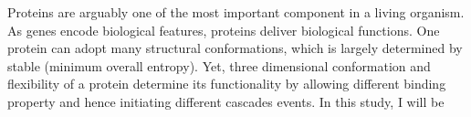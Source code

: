 Proteins are arguably one of the most important component in a living organism. As genes encode biological features, proteins deliver biological functions. One protein can adopt many structural conformations, which is largely determined by  stable (minimum overall entropy). Yet, three dimensional conformation and flexibility of a protein determine its functionality by allowing different binding property and hence initiating different cascades events. In this study, I will be 